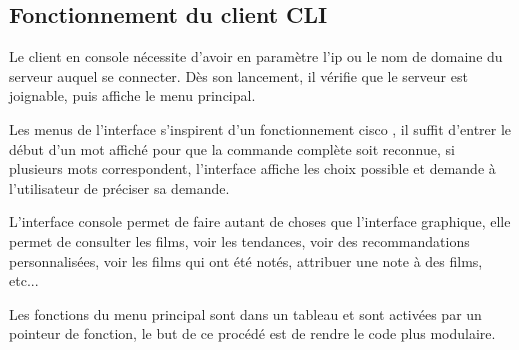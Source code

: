 % 
\subsection{Fonctionnement du client CLI}
Le client en console nécessite d'avoir en paramètre l'ip ou le nom de domaine du serveur auquel se connecter. Dès son lancement, il vérifie que le serveur est joignable, puis affiche le menu principal.\par
Les menus de l'interface s'inspirent d'un fonctionnement \og cisco \fg, il suffit d'entrer le début d'un mot affiché pour que la commande complète soit reconnue, si plusieurs mots correspondent, l'interface affiche les choix possible et demande à l'utilisateur de préciser sa demande.\par
L'interface console permet de faire autant de choses que l'interface graphique, elle permet de consulter les films, voir les tendances, voir des recommandations personnalisées, voir les films qui ont été notés, attribuer une note à des films, etc...\par
Les fonctions du menu principal sont dans un tableau et sont activées par un pointeur de fonction, le but de ce procédé est de rendre le code plus modulaire.\par
% 
